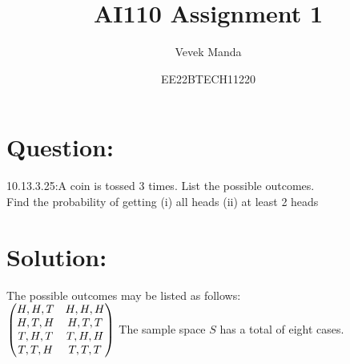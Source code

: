 \documentclass{article}
\title{AI110 Assignment 1}
\author{Vevek Manda }
\date{EE22BTECH11220}
\begin{document}
	
	
	
	\maketitle
	
	\section*{Question:}
	
	10.13.3.25:A coin is tossed 3 times. List the possible outcomes.\\
	Find the {probability} of getting
	(i) all heads (ii) at least 2 heads
	
	\section*{Solution:}
	The possible outcomes may be listed as follows:\\
	$\begin{pmatrix}
		{H,H,T} & {H,H,H}\\
		{H,T,H} & {H,T,T}\\
		{T,H,T} & {T,H,H}\\
		{T,T,H} & {T,T,T}
	\end{pmatrix}\\[3pt]$
	The sample space $S$ has a total of eight cases.
	
\end{document}
